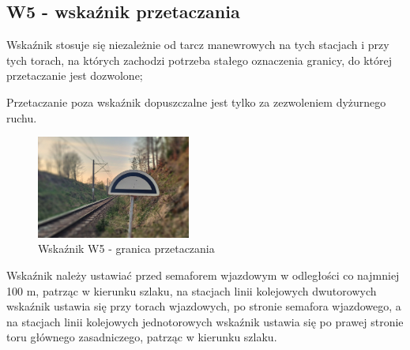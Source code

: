 \subsection{W5 - wskaźnik przetaczania}
\begin{tcolorbox}[colback=black!5!white,colframe=white!55!black,title=Wskaźnik W5]
Wskaźnik stosuje się niezależnie od tarcz manewrowych na tych stacjach i przy tych torach, na których zachodzi potrzeba stałego oznaczenia granicy, do której przetaczanie jest dozwolone;
\end{tcolorbox} Przetaczanie poza wskaźnik dopuszczalne jest tylko za zezwoleniem dyżurnego ruchu. 
	\begin{figure}
	\includegraphics[width=0.45\textwidth]{skryptkierownik-img/wskaznik-w5.jpg}
	\caption{Wskaźnik W5 - granica przetaczania}
\end{figure}
Wskaźnik należy ustawiać przed semaforem wjazdowym w odległości co najmniej 100 m, patrząc w kierunku szlaku, na stacjach linii kolejowych dwutorowych wskaźnik ustawia się przy torach wjazdowych, po stronie semafora wjazdowego, a na stacjach linii kolejowych jednotorowych wskaźnik ustawia się po prawej stronie toru głównego zasadniczego, patrząc w kierunku szlaku.


